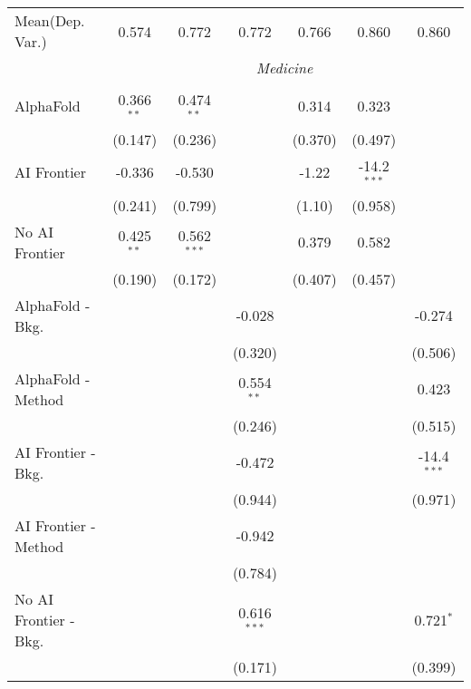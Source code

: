 \begin{tabular}{lcccccc}
Mean(Dep. Var.) & 0.574 & 0.772 & 0.772 & 0.766 & 0.860 & 0.860 \\
 & \multicolumn{6}{c}{\textit{Medicine}} \\ \\
   AlphaFold               & 0.366$^{**}$ & 0.474$^{**}$  &               & 0.314   & 0.323         &   \\   
                           & (0.147)      & (0.236)       &               & (0.370) & (0.497)       &   \\   
   AI Frontier             & -0.336       & -0.530        &               & -1.22   & -14.2$^{***}$ &   \\   
                           & (0.241)      & (0.799)       &               & (1.10)  & (0.958)       &   \\   
   No AI Frontier          & 0.425$^{**}$ & 0.562$^{***}$ &               & 0.379   & 0.582         &   \\   
                           & (0.190)      & (0.172)       &               & (0.407) & (0.457)       &   \\   
   AlphaFold - Bkg.        &              &               & -0.028        &         &               & -0.274\\   
                           &              &               & (0.320)       &         &               & (0.506)\\   
   AlphaFold - Method      &              &               & 0.554$^{**}$  &         &               & 0.423\\   
                           &              &               & (0.246)       &         &               & (0.515)\\   
   AI Frontier - Bkg.      &              &               & -0.472        &         &               & -14.4$^{***}$\\   
                           &              &               & (0.944)       &         &               & (0.971)\\   
   AI Frontier - Method    &              &               & -0.942        &         &               &   \\   
                           &              &               & (0.784)       &         &               &   \\   
   No AI Frontier - Bkg.   &              &               & 0.616$^{***}$ &         &               & 0.721$^{*}$\\   
                           &              &               & (0.171)       &         &               & (0.399)\\   

\end{tabular}
